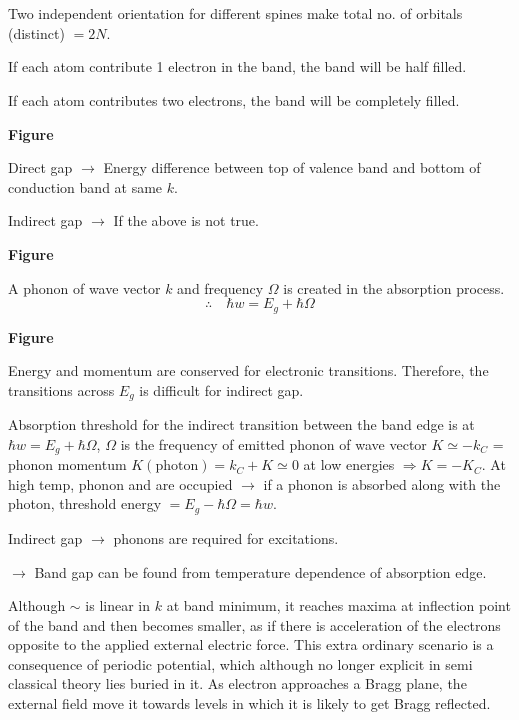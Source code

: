 \chapter{}\label{lec22}

Two independent orientation for different spines make total no. of orbitals (distinct) $=2N$.

If each atom contribute 1 electron in the band, the band will be half filled.

If each atom contributes two electrons, the band will be completely filled.
\begin{center}
{\bf Figure}
\end{center}
Direct gap $\to$ Energy difference between top of valence band and bottom of conduction band at same $k$.

Indirect gap $\to$ If the above is not true.
\begin{center}
{\bf Figure}
\end{center}
A phonon of wave vector $k$ and frequency $\Omega$ is created in the absorption process.
$$
\therefore\quad \hbar w=E_{g}+\hbar \Omega
$$
\begin{center}
{\bf Figure}
\end{center}
Energy and momentum are conserved for electronic transitions. Therefore, the transitions across $E_{g}$ is difficult for indirect gap.

Absorption threshold for the indirect transition between the band edge is at $\hbar w=E_{g}+\hbar\Omega$, $\Omega$ is the frequency of emitted phonon of wave vector $K\simeq -k_{C}$ = phonon momentum $K(\text{photon})=k_{C}+K\simeq 0$ at low energies $\Rightarrow K=-K_{C}$. At high temp, phonon and are occupied $\to$ if a phonon is absorbed along with the photon, threshold energy $=E_{g}-\hbar\Omega=\hbar w$.

Indirect gap $\to$ phonons are required for excitations.

$\to$ Band gap can be found from temperature dependence of absorption edge.

Although $\sim$ is linear in $k$ at band minimum, it reaches maxima at inflection  point of the band and then becomes smaller, as if there is acceleration of the electrons opposite to the applied external electric force. This extra ordinary scenario is a consequence of periodic potential, which although no longer explicit in semi classical theory lies buried in it. As electron approaches a Bragg plane, the external field move it towards levels in which it is likely to get Bragg reflected.




